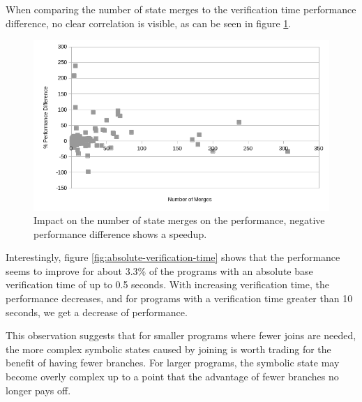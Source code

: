 \documentclass[11pt]{article}
\begin{document}
    When comparing the number of state merges 
    to the verification time performance difference, no clear correlation is
    visible, as can be seen in figure \ref{fig:state-merges}.

    \begin{figure}[H]
        \includegraphics[width=\linewidth]{state-merges-vs-performance.png}
        \caption{
            Impact on the number of state merges on the performance,
            negative performance difference shows a speedup.
        }
        \label{fig:state-merges}
    \end{figure}

    Interestingly, figure \ref{fig:absolute-verification-time} shows that the performance seems to
    improve for about 3.3\% of the programs
    with an absolute base verification time of up to 0.5 seconds. With increasing verification
    time, the performance decreases, and for programs with a verification time greater
    than 10 seconds, we get a decrease of performance.
    
    This observation suggests that for smaller programs where fewer joins are needed, the more complex symbolic
    states caused by joining is worth trading for the benefit of having fewer branches. For
    larger programs, the symbolic state may become overly complex up to a point that the advantage of
    fewer branches no longer pays off.
\end{document}
